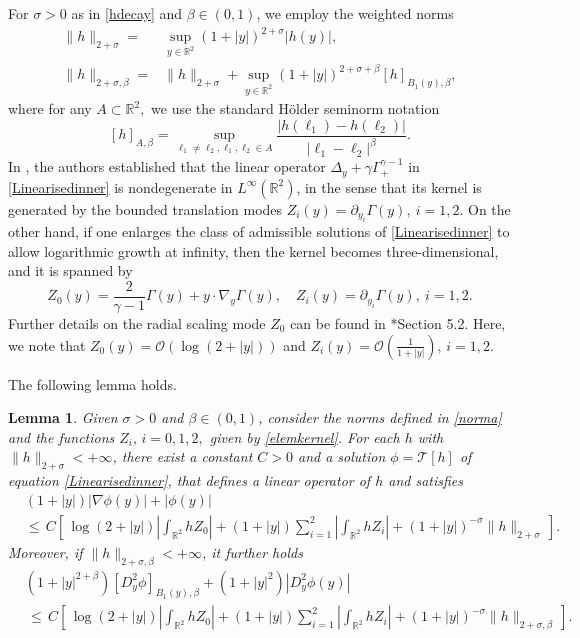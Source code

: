 \documentclass[11pt,reqno,a4paper]{amsart}
\numberwithin{equation}{section}
\newcommand{\R}{\mathbb{R}}
\newcommand{\be}{\begin{equation}}
\newcommand{\ee}{\end{equation}}
\newtheorem{lemma}{Lemma}[section]
\begin{document}
For $\sigma>0$ as in \eqref{hdecay} and $\beta\in(0,1)$, we employ the weighted norms
\be\label{norma} \begin{aligned}
\|h\|_{2+\sigma}  = & \sup_{y\in \R^2} (1+|y|)^{2+\sigma}|h(y)|, \\
\|h\|_{2+\sigma,\beta}  = &\|h\|_{2+\sigma}  +   \sup_{y\in \R^2}(1+|y|)^{2+\sigma + \beta}[h]_{B_1(y),\beta} ,
\end{aligned}
\ee
where for any $A\subset \R^2,$ we use the standard H\"{o}lder seminorm notation
$$
[h]_{A,\beta} = \sup_{\ell_1\neq \ell_2, \ell_1,\ell_2\in A}  \frac {|h(\ell_1) -h(\ell_2)| } {|\ell_1-\ell_2|^\beta}.
$$
In \cite{MR2456896}, the authors established that the linear operator $\Delta_y +\gamma\Gamma^{\gamma-1}_{+}$ in \eqref{Linearisedinner} is nondegenerate in $L^{\infty}(\R^2)$, in the sense that its kernel is generated by the bounded translation modes $Z_i(y)=\partial_{y_i}\Gamma(y), \ i=1,2$. On the other hand, if one enlarges the class of admissible solutions of \eqref{Linearisedinner} to allow logarithmic growth at infinity, then the kernel becomes three-dimensional, and it is spanned by
\begin{equation}\label{elemkernel}
Z_0(y)=\frac{2}{\gamma-1}\Gamma(y)+y\cdot\nabla_y \Gamma(y), \quad  Z_i(y)  =  \partial_{y_i}  \Gamma(y), \  i=1,2.
\end{equation}
Further details on the radial scaling mode $Z_0$ can be found in \cite{MR5036920}*{Section 5.2}. Here, we note that $Z_0(y)=\mathcal{O}\left(\log\left(2+|y|\right)\right)$ and $Z_i(y)=\mathcal{O}\left(\frac{1}{1+|y|}\right),\,i=1,2$. 

The following lemma holds.
\begin{lemma}\label{lemat}
Given $\sigma>0$ and $\beta\in (0,1)$, consider the norms defined in \eqref{norma} and the functions $Z_i,\,i=0,1,2,$ given by \eqref{elemkernel}. For each $h$ with $\|h\|_{2+\sigma} <+\infty$,
there exist a constant $C>0$ and a solution $\phi =  \mathcal{T} [ h]$ of equation \eqref{Linearisedinner}, that defines a linear operator of $h$ and satisfies
\begin{equation*}
\begin{aligned}
&(1+|y|) |\nabla \phi (y)|  + | \phi (y)| \\
&\le  \,  C \left [ \,  \log \left(2+|y|\right) \left|\int_{\R^2} h Z_0\right|  +    (1+|y|) \sum_{i=1}^2 \left|\int_{\R^2} h Z_i\right|+  (1+|y|)^{-\sigma} \|h\|_{2+\sigma}   \,\right].
\end{aligned}
\end{equation*}
Moreover, if 
$\|h\|_{2+\sigma,\beta} <+\infty$, it further holds
\begin{equation*}
\begin{aligned}
& (1+|y|^{2+\beta})  [D^2_y \phi]_{B_1(y),\beta}  +\left(1+|y|^2\right)  \left|D^2_y \phi (y)\right| \\  &
\,  \le  \,   C \left [ \,  \log \left(2+|y|\right) \left|\int_{\R^2} h Z_0\right|  +    (1+|y|) \sum_{i=1}^2 \left|\int_{\R^2} h Z_i\right|  +  (1+|y|)^{-\sigma} \|h\|_{2+\sigma,\beta}   \,\right]. 
\end{aligned}
\end{equation*}
\end{lemma}
\end{document}
